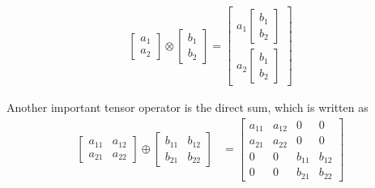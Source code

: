\begin{align}
\begin{bmatrix}
a_{1}  \\
a_{2} 
\end{bmatrix}
\otimes
\begin{bmatrix}
b_{1}\\
b_{2}
\end{bmatrix} = 
\begin{bmatrix}
a_{1}  \begin{bmatrix}
b_{1}\\
b_{2}
\end{bmatrix} \\
a_{2} \begin{bmatrix}
b_{1}\\
b_{2}
\end{bmatrix} 
\end{bmatrix}
\end{align}

Another important tensor operator is the direct sum, which is written as
\begin{align}
	\begin{bmatrix}
a_{11} & a_{12} \\
a_{21} & a_{22}
\end{bmatrix}
\oplus
\begin{bmatrix}
b_{11} & b_{12} \\
b_{21} & b_{22}
\end{bmatrix} &=
\begin{bmatrix}
a_{11} & a_{12} & 0 & 0\\
a_{21} & a_{22} & 0 & 0\\
0 & 0& b_{11} & b_{12}\\
0 & 0 & b_{21} & b_{22}
\end{bmatrix}
\end{align}

